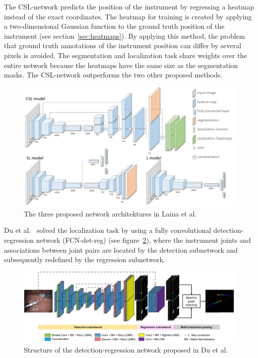 The CSL-network predicts the position of the instrument by regressing a heatmap instead of the exact coordinates.
The heatmap for training is created by applying a two-dimensional Gaussian function to the ground truth position of the instrument (see section~\ref{sec:heatmaps}). 
By applying this method, the problem that ground truth annotations of the instrument position
can differ by several pixels is avoided. The segmentation and localization task share weights over the entire network because the heatmaps have the same size as the segmentation masks.
The CSL-network outperforms the two other proposed methods.

\begin{figure}
	\centering
	\includegraphics[width=.6\textwidth]{images/networks/CSL_network.png}
	\caption[Concurrent Segmentation and Tracking Networks~\cite{Laina2017}]{The three proposed network architektures in Laina et al.~\cite{Laina2017}}
	\label{img:csl_network}
\end{figure}

Du et al.~\cite{du2018_2D_pose_est_CNN} solved the localization task by using a fully convolutional detection-regression network (FCN-det-reg) (see figure~\ref{detection-regression-net}), where the instrument joints and associations between joint pairs are located by the detection subnetwork and subsequently redefined by the regression subnetwork. 

\begin{figure}
	\centering
	\includegraphics[width=.8\textwidth]{images/networks/detection-regression.jpg}
 	\caption[Detection-regression network~\cite{du2018_2D_pose_est_CNN}]{Structure of the detection-regression network proposed in Du et al.~\cite{du2018_2D_pose_est_CNN}}
 	\label{detection-regression-net}
\end{figure}


